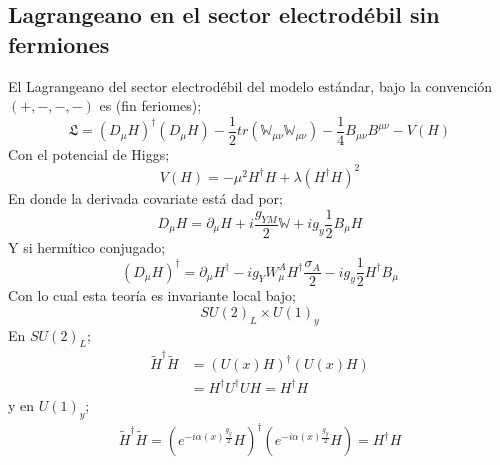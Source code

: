 \documentclass[../main.tex]{subfiles}
\begin{document}
\subsection{Lagrangeano en el sector electrodébil sin fermiones}
El Lagrangeano del sector electrodébil del modelo estándar, bajo la convención $(+,-,-,-)$ es (fin feriomes);
\begin{equation}
  \mathfrak{L} = \left( D_\mu H \right)^\dagger \left( D_\mu H \right) - \frac{1}{2}tr \left( \mathbb{W}_{\mu\nu}\mathbb{W}_{\mu\nu} \right) - \frac{1}{4}B_{\mu\nu} B^{\mu\nu} - V(H)
 \end{equation}
 Con el potencial de Higgs;
 \begin{equation}
   V(H) = -\mu^2 H^\dagger H + \lambda \left( H^\dagger H \right)^2
  \end{equation}
  En donde la derivada covariate está dad por;
  \begin{equation}
    D_\mu H = \partial_\mu H +i \frac{g_{YM}}{2} \mathbb{W} + ig_y \frac{1}{2}B_\mu H
   \end{equation}
   Y si hermítico conjugado;
   \begin{equation}
     \left( D_\mu H \right)^\dagger =\partial_\mu H^\dagger -ig_{Y}W^A_\mu H^\dagger \frac{\sigma_A}{2} - ig_y \frac{1}{2}H^\dagger B_\mu 
   \end{equation}
   Con lo cual esta teoría es invariante local bajo;
   \begin{equation}
     SU(2)_L \times U(1)_y
    \end{equation}
 En $SU(2)_L$;
 \begin{align*}
   \tilde{H}^\dagger \tilde{H} & = \left( U(x)H \right)^\dagger \left( U(x)H \right) \\
   & = H^\dagger U^\dagger U H  =H^\dagger H
\end{align*}
y en $U(1)_y$;
\begin{align*}
  \tilde{H}^\dagger \tilde{H} = \left( e^{-i\alpha(x)\frac{g_y}{2}} H \right)^\dagger \left( e^{-i\alpha(x)\frac{g_y}{2}} H\right) = H^\dagger H
\end{align*}
\end{document}
